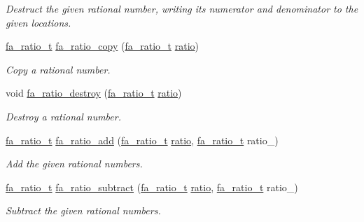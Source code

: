 \begin{DoxyCompactItemize}
\begin{DoxyCompactList}\small\item\em Destruct the given rational number, writing its numerator and denominator to the given locations. \end{DoxyCompactList}\item 
\hyperlink{group___fa_ratio_gaf3b37b5fdfcccb6283b7ac806c72b273}{fa\-\_\-ratio\-\_\-t} \hyperlink{group___fa_ratio_ga240d745928d4f3ea0f03930617580f62}{fa\-\_\-ratio\-\_\-copy} (\hyperlink{group___fa_ratio_gaf3b37b5fdfcccb6283b7ac806c72b273}{fa\-\_\-ratio\-\_\-t} \hyperlink{util_8h_a866d3cbbee2679ec3c34f27a256445de}{ratio})
\begin{DoxyCompactList}\small\item\em Copy a rational number. \end{DoxyCompactList}\item 
void \hyperlink{group___fa_ratio_gaa65ebd7b8a36f340bf5d54ff8d14738e}{fa\-\_\-ratio\-\_\-destroy} (\hyperlink{group___fa_ratio_gaf3b37b5fdfcccb6283b7ac806c72b273}{fa\-\_\-ratio\-\_\-t} \hyperlink{util_8h_a866d3cbbee2679ec3c34f27a256445de}{ratio})
\begin{DoxyCompactList}\small\item\em Destroy a rational number. \end{DoxyCompactList}\item 
\hyperlink{group___fa_ratio_gaf3b37b5fdfcccb6283b7ac806c72b273}{fa\-\_\-ratio\-\_\-t} \hyperlink{group___fa_ratio_ga6f21aa6cbc2216a1277f2158968ce52b}{fa\-\_\-ratio\-\_\-add} (\hyperlink{group___fa_ratio_gaf3b37b5fdfcccb6283b7ac806c72b273}{fa\-\_\-ratio\-\_\-t} \hyperlink{util_8h_a866d3cbbee2679ec3c34f27a256445de}{ratio}, \hyperlink{group___fa_ratio_gaf3b37b5fdfcccb6283b7ac806c72b273}{fa\-\_\-ratio\-\_\-t} ratio\-\_\-)
\begin{DoxyCompactList}\small\item\em Add the given rational numbers. \end{DoxyCompactList}\item 
\hyperlink{group___fa_ratio_gaf3b37b5fdfcccb6283b7ac806c72b273}{fa\-\_\-ratio\-\_\-t} \hyperlink{group___fa_ratio_ga4532996b003dc8a628053dd8d159cf82}{fa\-\_\-ratio\-\_\-subtract} (\hyperlink{group___fa_ratio_gaf3b37b5fdfcccb6283b7ac806c72b273}{fa\-\_\-ratio\-\_\-t} \hyperlink{util_8h_a866d3cbbee2679ec3c34f27a256445de}{ratio}, \hyperlink{group___fa_ratio_gaf3b37b5fdfcccb6283b7ac806c72b273}{fa\-\_\-ratio\-\_\-t} ratio\-\_\-)
\begin{DoxyCompactList}\small\item\em Subtract the given rational numbers. \end{DoxyCompactList}\item 

\end{DoxyCompactItemize}
